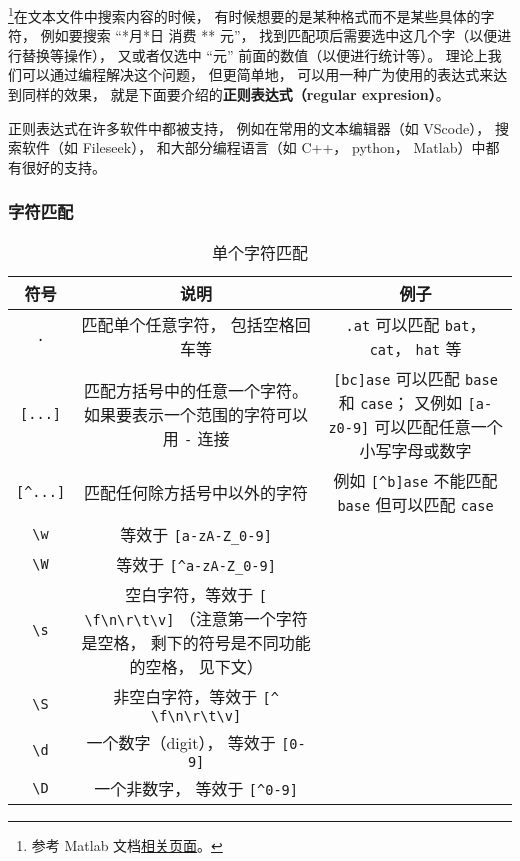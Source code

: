 
\begin{issues}
\issueDraft
\end{issues}


\footnote{参考 Matlab 文档\href{https://www.mathworks.com/help/matlab/ref/regexp.html}{相关页面}。}在文本文件中搜索内容的时候， 有时候想要的是某种格式而不是某些具体的字符， 例如要搜索 “*月*日 消费 ** 元”， 找到匹配项后需要选中这几个字（以便进行替换等操作）， 又或者仅选中 “元” 前面的数值（以便进行统计等）。 理论上我们可以通过编程解决这个问题， 但更简单地， 可以用一种广为使用的表达式来达到同样的效果， 就是下面要介绍的\textbf{正则表达式（regular expresion）}。

正则表达式在许多软件中都被支持， 例如在常用的文本编辑器（如 VScode）， 搜索软件（如 Fileseek）， 和大部分编程语言（如 C++， python， Matlab）中都有很好的支持。

\subsubsection{字符匹配}
\begin{table}[ht]
\centering
\caption{单个字符匹配}\label{tab_regex_1}
\begin{tabular}{|c|c|c|}
\hline
符号 & 说明 & 例子 \\
\hline
\verb|.| & 匹配单个任意字符， 包括空格回车等 & \verb|.at| 可以匹配 \verb|bat|， \verb|cat|， \verb|hat| 等 \\
\hline
\verb|[...]| & 匹配方括号中的任意一个字符。 如果要表示一个范围的字符可以用 \verb|-| 连接 & \verb|[bc]ase| 可以匹配 \verb|base| 和 \verb|case|； 又例如 \verb|[a-z0-9]| 可以匹配任意一个小写字母或数字 \\
\hline
\verb|[^...]| & 匹配任何除方括号中以外的字符 & 例如 \verb|[^b]ase| 不能匹配 \verb|base| 但可以匹配 \verb|case| \\
\hline
\verb|\w| & 等效于 \verb|[a-zA-Z_0-9]| &  \\
\hline
\verb|\W| & 等效于 \verb|[^a-zA-Z_0-9]| &  \\
\hline
\verb|\s| & 空白字符，等效于 \verb|[ \f\n\r\t\v]| （注意第一个字符是空格， 剩下的符号是不同功能的空格， 见下文） &  \\
\hline
\verb|\S| & 非空白字符，等效于 \verb|[^ \f\n\r\t\v]| & \\
\hline
\verb|\d| & 一个数字（digit）， 等效于 \verb|[0-9]| & \\
\hline
\verb|\D| & 一个非数字， 等效于 \verb|[^0-9]| & \\
\hline
\end{tabular}
\end{table}

